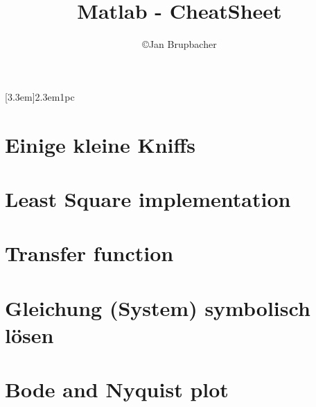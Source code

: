 % 
%

\newcommand{\Author}{\copyright Jan Brupbacher}
\newcommand{\Title}{Matlab - CheatSheet}

\author{\Author}
\title{\Title}


	

\usepackage{bold-extra}

[3.3em]{\bfseries}{2.3em}{1pc}


	\maketitle
	\vspace{1em}
	\begin{adjustwidth}{4em}{4em}
		\tableofcontents
	\end{adjustwidth}
	\newpage
	
	\lstset{
		style=Matlab,
		numbers=left,
		xleftmargin=15pt,
	}
	\section{Einige kleine Kniffs}
	
	\section{Least Square implementation}
	
	\section{Transfer function}
	
	\section{Gleichung (System) symbolisch l\"osen}
	
	\section{Bode and Nyquist plot}
	
